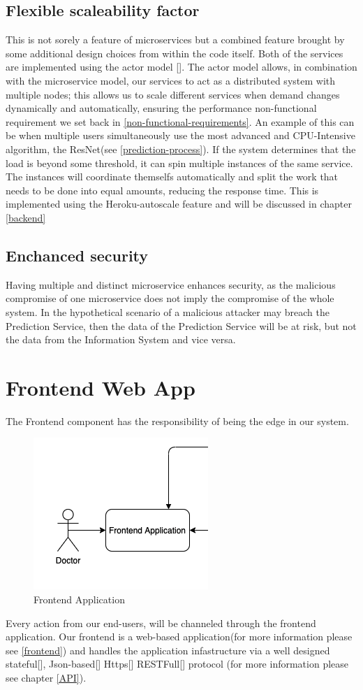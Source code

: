 		\subsection{Flexible scaleability factor}
			This is not sorely a feature of microservices but a combined feature brought by some additional design choices 
			from within the code itself. Both of the services are implemented using the actor model [\cite{hewitt2015actor}]. 
			The actor model allows, in combination with the microservice model, our services to act as a distributed system with 
			multiple nodes; this allows us to scale different services when demand changes dynamically and automatically, ensuring 
			the performance non-functional requirement we set back in \ref{non-functional-requirements}. An example of this can be 
			when multiple users simultaneously use the most advanced and CPU-Intensive algorithm, the ResNet(see \ref{prediction-process}). 
			If the system determines that the load is beyond some threshold, it can spin multiple instances of the same service. 
			The instances will coordinate themselfs automatically and split the work that needs to be done into equal amounts, 
			reducing the response time. This is implemented using the Heroku-autoscale feature and will be discussed in chapter \ref{backend}
		\subsection{Enchanced security}
			Having multiple and distinct microservice enhances security, as the malicious compromise of one microservice does not
			 imply the compromise of the whole system. In the hypothetical scenario of a malicious attacker may breach the 
			 Prediction Service, then the data of the Prediction Service will be at risk, but not the data from the Information 
			 System and vice versa.
	\section{Frontend Web App}
		The Frontend component has the responsibility of being the edge in our system.
		\begin{figure}[H]
			\iftrue
			\caption{Frontend Application}
			\centering
			\includegraphics[scale=0.5]{figures/frontend}
			\fi
		\end{figure}
		Every action from our end-users, will be channeled through the frontend application. Our frontend is a web-based application(for 
		more information please see \ref{frontend}) and handles the application infastructure via a well designed stateful[\cite{session-rfc6265}],
		Json-based[\cite{json-rfc7159}] Https[\cite{rfc2818}] RESTFull[\cite{restful-rfc7231}]
		protocol (for more information please see chapter \ref{API}).
